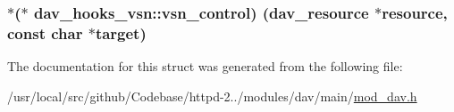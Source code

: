 \subsubsection[{\texorpdfstring{vsn\+\_\+control}{vsn_control}}]{$\ast$($\ast$ dav\+\_\+hooks\+\_\+vsn\+::vsn\+\_\+control) ({\bf dav\+\_\+resource} $\ast${\bf resource}, const char $\ast$target)}\hypertarget{structdav__hooks__vsn_abe6804c531679fc0c36e4b27fc7f8632}{}\label{structdav__hooks__vsn_abe6804c531679fc0c36e4b27fc7f8632}


The documentation for this struct was generated from the following file\+:\begin{DoxyCompactItemize}
\item 
/usr/local/src/github/\+Codebase/httpd-\/2../modules/dav/main/\hyperlink{mod__dav_8h}{mod\+\_\+dav.\+h}\end{DoxyCompactItemize}
